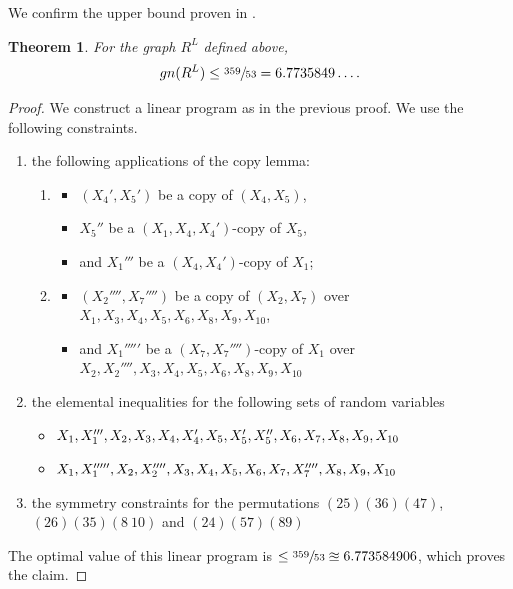 \documentclass[11pt, a4paper]{kybernetika}
\newtheorem{theorem}{Theorem}[section]
\begin{document}
	We confirm the upper bound proven in \cite{baber2016graph}.
	\begin{theorem}
		For the graph $R^L$ defined above, $$gn(R^L)\le\sfrac{359}{53}=6.7735849\ldots.$$
	\end{theorem}
	\begin{proof}
		We construct a linear program as in the previous proof. We use the following constraints.
		\begin{enumerate}
			\item the following applications of the copy lemma:
			\begin{enumerate}
				\item \begin{itemize}
					\item $(X_4',X_5')$ be a copy of $(X_4,X_5)$,
					\item $X_5''$ be a $(X_1,X_4,X_4')$-copy of $X_5$,
					\item and $X_1'''$ be a $(X_4,X_4')$-copy of $X_1$;
				\end{itemize}  
				\item \begin{itemize}
					\item $(X_2'''',X_7'''')$ be a copy of $(X_2,X_7)$ over $X_1,X_3,X_4,X_5,X_6,X_8,X_9,X_{10}$,
					\item and $X_1'''''$ be a $(X_7,X_7'''')$-copy of $X_1$ over $X_2,X_2'''',X_3,X_4,X_5,X_6,X_8,X_9,X_{10}$
				\end{itemize} 
			\end{enumerate}
			\item the elemental inequalities for the following sets of random variables
			\begin{itemize}
				\item $X_1,X_1''',X_2,X_3,X_4,X_4',X_5,\\X_5',X_5'',X_6,X_7,X_8,X_9,X_{10}$
				\item $X_1,X_1''''',X_2,X_2'''',X_3,X_4,X_5,\\X_6,X_7,X_7'''',X_8,X_9,X_{10}$
			\end{itemize}
			\item the symmetry constraints for the permutations $(25)(36)(47)$, $(26)(35)(8\ 10)$ and $(24)(57)(89)$
		\end{enumerate}
		The optimal value of this linear program is $\le\sfrac{359}{53}\approxeq6.773584906$, which proves the claim.
	\end{proof}
\end{document}
